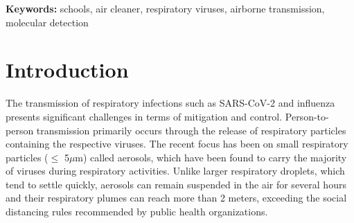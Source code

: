 \documentclass[fleqn,11pt]{wlscirep}
\begin{document}

\flushbottom
\maketitle
\setcounter{page}{1}
\thispagestyle{fancy}

\vspace{2em}


\vspace{0.5em}

\noindent\textbf{Keywords:} schools, air cleaner, respiratory viruses, airborne transmission, molecular detection
\newpage

\sloppy
\raggedbottom

\newpage

\section{Introduction} 

The transmission of respiratory infections such as SARS-CoV-2 and influenza presents significant challenges in terms of mitigation and control. Person-to-person transmission primarily occurs through the release of respiratory particles containing the respective viruses. The recent focus has been on small respiratory particles ($\leq$ 5$\mu$m) called aerosols, which have been found to carry the majority of viruses during respiratory activities\cite{Fennelly2020}. Unlike larger respiratory droplets, which tend to settle quickly, aerosols can remain suspended in the air for several hours and their respiratory plumes can reach more than 2 meters\cite{Coleman2022,Wang2020,Heneghan2021}, exceeding the social distancing rules recommended by public health organizations\cite{Bazant2021PNAS,Trivedi2021PhyFluids,Lindsley2010CID}. 
\end{document}
